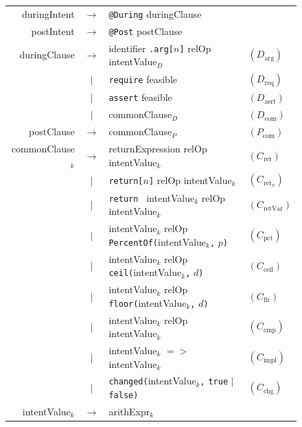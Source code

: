 \documentclass[11pt,oneside]{report}
\renewcommand\arraystretch{1.3}
\theoremstyle{plain}
\theoremstyle{definition}
\theoremstyle{remark}
\begin{document}
\begin{figure}[!t]
\centering
{}\small
\renewcommand{\arraystretch}{1.0}
\begin{tabular}{@{}r@{\quad}c@{\quad}l@{\qquad}l@{}}

duringIntent
  & $\rightarrow$ & \texttt{@During} duringClause & \\[2pt]

postIntent
  & $\rightarrow$ & \texttt{@Post} postClause & \\[6pt]

duringClause
  & $\rightarrow$ &
    identifier \texttt{.arg[}$n$\texttt{]} relOp intentValue$_D$
  & $(D_{\text{arg}})$ \\
  & $|$ & \texttt{require} feasible
  & $(D_{\text{req}})$ \\
  & $|$ & \texttt{assert} feasible
  & $(D_{\text{asrt}})$ \\
  & $|$ & commonClause$_D$
  & $(D_{\text{com}})$ \\[6pt]

postClause
  & $\rightarrow$ & commonClause$_P$
  & $(P_{\text{com}})$ \\[6pt]

commonClause$_k$
  & $\rightarrow$ & returnExpression relOp intentValue$_k$
  & $(C_{\text{ret}})$ \\
  & $|$ & \texttt{return[}$n$\texttt{]} relOp intentValue$_k$
  & $(C_{\text{ret}_n})$ \\
  & $|$ & \texttt{return } intentValue$_k$ relOp intentValue$_k$
  & $(C_{\text{retVar}})$ \\
  & $|$ & intentValue$_k$ relOp
           \texttt{PercentOf(}intentValue$_k$\texttt{,} $p$\texttt{)}
  & $(C_{\text{pct}})$ \\
  & $|$ & intentValue$_k$ relOp
           \texttt{ceil(}intentValue$_k$\texttt{,} $d$\texttt{)}
  & $(C_{\text{ceil}})$ \\
  & $|$ & intentValue$_k$ relOp
           \texttt{floor(}intentValue$_k$\texttt{,} $d$\texttt{)}
  & $(C_{\text{flr}})$ \\
  & $|$ & intentValue$_k$ relOp intentValue$_k$
  & $(C_{\text{cmp}})$ \\
  & $|$ & intentValue$_k$ ${=}{>}$ intentValue$_k$
  & $(C_{\text{impl}})$ \\
  & $|$ & \texttt{changed(}intentValue$_k$\texttt{,}
           \texttt{true} $|$ \texttt{false}\texttt{)}
  & $(C_{\text{chg}})$ \\[6pt]

intentValue$_k$
  & $\rightarrow$ & arithExpr$_k$ & \\[2pt]


\end{tabular}
\end{figure}
\end{document}
